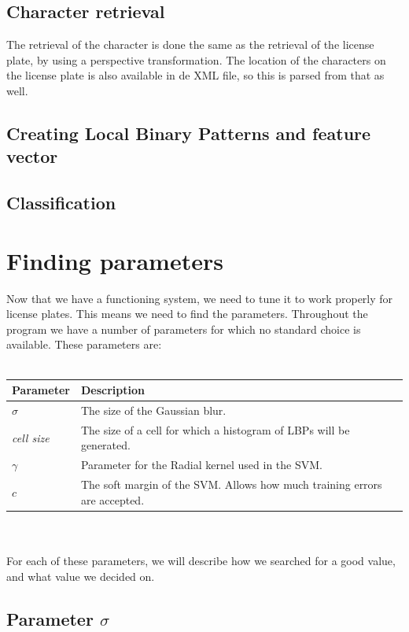 \documentclass[a4paper]{article}
\begin{document}
\subsection{Character retrieval}

The retrieval of the character is done the same as the retrieval of the license
plate, by using a perspective transformation. The location of the characters on
the license plate is also available in de XML file, so this is parsed from that
as well.

\subsection{Creating Local Binary Patterns and feature vector}



\subsection{Classification}



\section{Finding parameters}

Now that we have a functioning system, we need to tune it to work properly for
license plates. This means we need to find the parameters. Throughout the 
program we have a number of parameters for which no standard choice is
available. These parameters are:\\
\\
\begin{tabular}{l|l}
	Parameter 			& Description\\
	\hline
	$\sigma$  			& The size of the Gaussian blur.\\
	\emph{cell size}	& The size of a cell for which a histogram of LBPs will
	                      be generated.\\
	$\gamma$			& Parameter for the Radial kernel used in the SVM.\\
	$c$					& The soft margin of the SVM. Allows how much training
						  errors are accepted.
\end{tabular}\\
\\
For each of these parameters, we will describe how we searched for a good
value, and what value we decided on.

\subsection{Parameter $\sigma$}
\end{document}
